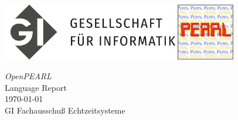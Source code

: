 \documentclass{book}
\def\OpenPEARL{{\it OpenPEARL}}
\begin{document}
\begin{titlepage}
\includegraphics[height=2.5cm]{GI_Logo_links.png}\hfill
\hfill
\includegraphics[height=2.5cm]{pearl.jpg}

\vspace{3cm}

\begin{center}
{\Huge \OpenPEARL} \\
\vspace{1cm}
Language Report\\
\vspace{5cm}
\today{}\\
\vspace{10cm}
GI Fachausschu{\ss} Echtzeitsysteme

\end{center}
\end{titlepage}


\tableofcontents

\end{document}
